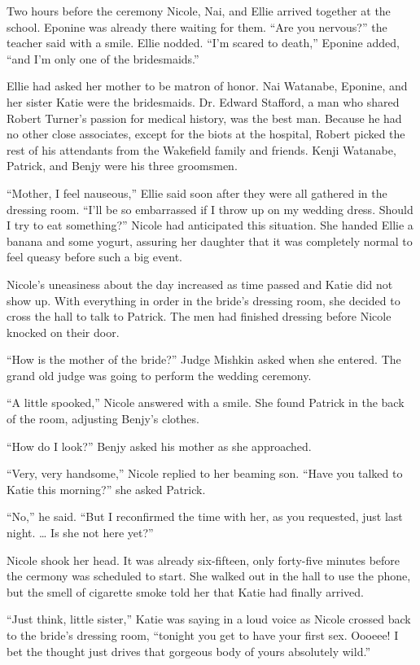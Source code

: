 \documentclass[]{article}
\begin{document}
{Two hours before the ceremony Nicole, Nai, and Ellie arrived together at the school.  Eponine was already there waiting for them.  “Are you nervous?” the teacher said with a smile.  Ellie nodded.  “I’m scared to death,” Eponine added, “and I’m only one of the bridesmaids.”

Ellie had asked her mother to be matron of honor.  Nai Watanabe, Eponine, and her sister Katie were the bridesmaids.  Dr.  Edward Stafford, a man who shared Robert Turner’s passion for medical history, was the best man.  Because he had no other close associates, except for the biots at the hospital, Robert picked the rest of his attendants from the Wakefield family and friends.  Kenji Watanabe, Patrick, and Benjy were his three groomsmen.

“Mother, I feel nauseous,” Ellie said soon after they were all gathered in the dressing room.  “I’ll be so embarrassed if I throw up on my wedding dress.  Should I try to eat something?” Nicole had anticipated this situation.  She handed Ellie a banana and some yogurt, assuring her daughter that it was completely normal to feel queasy before such a big event.

Nicole’s uneasiness about the day increased as time passed and Katie did not show up.  With everything in order in the bride’s dressing room, she decided to cross the hall to talk to Patrick.  The men had finished dressing before Nicole knocked on their door.

“How is the mother of the bride?” Judge Mishkin asked when she entered.  The grand old judge was going to perform the wedding ceremony.

“A little spooked,” Nicole answered with a smile.  She found Patrick in the back of the room, adjusting Benjy’s clothes.

“How do I look?” Benjy asked his mother as she approached.

“Very, very handsome,” Nicole replied to her beaming son.  “Have you talked to Katie this morning?” she asked Patrick.

“No,” he said.  “But I reconfirmed the time with her, as you requested, just last night.  … Is she not here yet?”

Nicole shook her head.  It was already six-fifteen, only forty-five minutes before the cermony was scheduled to start.  She walked out in the hall to use the phone, but the smell of cigarette smoke told her that Katie had finally arrived.

“Just think, little sister,” Katie was saying in a loud voice as Nicole crossed back to the bride’s dressing room, “tonight you get to have your first sex.  Oooeee! I bet the thought just drives that gorgeous body of yours absolutely wild.”

}
\end{document}
